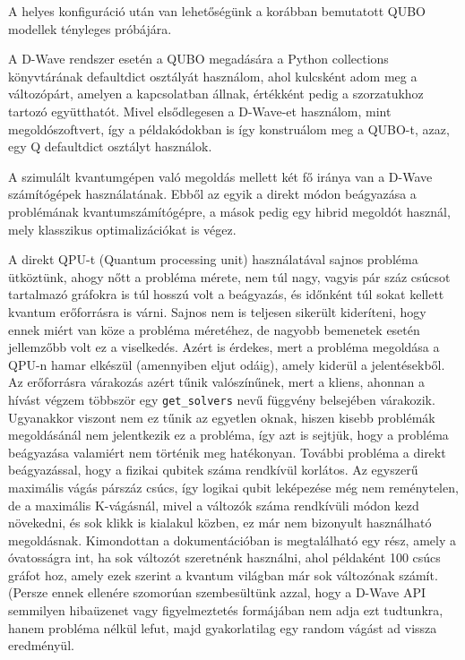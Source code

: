 A helyes konfiguráció után van lehetőségünk a korábban bemutatott QUBO modellek tényleges próbájára.

A D-Wave rendszer esetén a QUBO megadására a Python collections könyvtárának defaultdict osztályát használom, ahol kulcsként adom meg a változópárt, amelyen a kapcsolatban állnak, értékként pedig a szorzatukhoz tartozó együtthatót. Mivel elsődlegesen a D-Wave-et használom, mint megoldószoftvert, így a példakódokban is így konstruálom meg a QUBO-t, azaz, egy Q defaultdict osztályt használok.

A szimulált kvantumgépen való megoldás mellett két fő iránya van a D-Wave számítógépek használatának. Ebből az egyik a direkt módon beágyazása a problémának kvantumszámítógépre, a mások pedig egy hibrid megoldót használ, mely klasszikus optimalizációkat is végez.


A direkt QPU-t (Quantum processing unit) használatával sajnos probléma ütköztünk, ahogy nőtt a probléma mérete, nem túl nagy, vagyis pár száz csúcsot tartalmazó gráfokra is túl hosszú volt a beágyazás, és időnként túl sokat kellett kvantum erőforrásra is várni. Sajnos nem is teljesen sikerült kideríteni, hogy ennek miért van köze a probléma méretéhez, de nagyobb bemenetek esetén jellemzőbb volt ez a viselkedés. Azért is érdekes, mert a probléma megoldása a QPU-n hamar elkészül (amennyiben eljut odáig), amely kiderül a jelentésekből. Az erőforrásra várakozás azért tűnik valószínűnek, mert a kliens, ahonnan a hívást végzem többször egy \verb+get_solvers+ nevű függvény belsejében várakozik. Ugyanakkor viszont nem ez tűnik az egyetlen oknak, hiszen kisebb problémák megoldásánál nem jelentkezik ez a probléma, így azt is sejtjük, hogy a probléma beágyazása valamiért nem történik meg hatékonyan.
További probléma a direkt beágyazással, hogy a fizikai qubitek száma rendkívül korlátos. Az egyszerű maximális vágás párszáz csúcs, így logikai qubit leképezése még nem reménytelen, de a maximális K-vágásnál, mivel a változók száma rendkívüli módon kezd növekedni, és sok klikk is kialakul közben, ez már nem bizonyult használható megoldásnak. Kimondottan a dokumentációban is megtalálható egy rész, amely a óvatosságra int, ha sok változót szeretnénk használni, ahol példaként 100 csúcs gráfot hoz, amely ezek szerint a kvantum világban már sok változónak számít. (Persze ennek ellenére szomorúan szembesültünk azzal, hogy a D-Wave API semmilyen hibaüzenet vagy figyelmeztetés formájában nem adja ezt tudtunkra, hanem probléma nélkül lefut, majd gyakorlatilag egy random vágást ad vissza eredményül.


